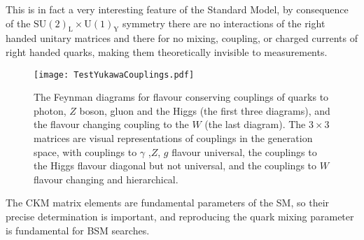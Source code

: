 This is in fact a very interesting feature of the Standard Model, by consequence of the $\mathrm{SU(2)_L \times U(1)_Y }$ symmetry there are no interactions of the right handed unitary matrices and there for no mixing, coupling, or charged currents of right handed quarks, making them theoretically invisible to measurements.  
%
\begin{figure}[H]
	\centering
	\texttt{[image: TestYukawaCouplings.pdf]}
	\caption{The Feynman diagrams for flavour conserving couplings of quarks to photon, $Z$ boson, gluon and the Higgs (the first three diagrams), and the flavour changing coupling to the $W$ (the last diagram). The $3\times3$ matrices are visual representations of couplings in the generation space, with couplings to $\gamma$ ,$Z$, $g$ flavour universal, the couplings to the Higgs flavour diagonal but not universal, and the couplings to $W$ flavour changing and hierarchical.}
	\label{fig:Yukawa}
\end{figure}
%

%

The CKM matrix elements are fundamental parameters of the SM, so their precise determination is important, and reproducing the quark mixing parameter is fundamental for BSM searches. 
